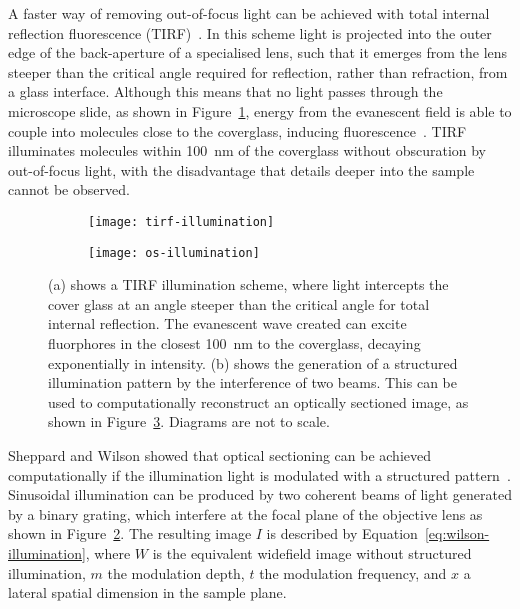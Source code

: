 A faster way of removing out-of-focus light can be achieved with total internal reflection fluorescence (TIRF)~\cite[\textit{ch. 21}]{periasamy2013methods}.
In this scheme light is projected into the outer edge of the back-aperture of a specialised lens, such that it emerges from the lens steeper than the critical angle required for reflection, rather than refraction, from a glass interface.
Although this means that no light passes through the microscope slide, as shown in Figure~\ref{fig:tirf-illumination}, energy from the evanescent field is able to couple into molecules close to the coverglass, inducing fluorescence~\cite{axelrod1981cell}.
TIRF illuminates molecules within \SI{100}{\nano\metre} of the coverglass without obscuration by out-of-focus light, with the disadvantage that details deeper into the sample cannot be observed.

\begin{figure}[tbp]
\centering
\begin{subfigure}[b]{0.49\textwidth}
	\texttt{[image: tirf-illumination]}
	\caption{}\label{fig:tirf-illumination}
\end{subfigure}
\hfill
\begin{subfigure}[b]{0.49\textwidth}
	\texttt{[image: os-illumination]}
	\caption{}\label{fig:os-illumination}
\end{subfigure}
\caption[LAG SIM: Both TIRF microscopy and structured illumination patterns can be used to remove out-of-focus light]{(a) shows a TIRF illumination scheme, where light intercepts the cover glass at an angle steeper than the critical angle for total internal reflection. The evanescent wave created can excite fluorphores in the closest \SI{100}{\nano\metre} to the coverglass, decaying exponentially in intensity. (b) shows the generation of a structured illumination pattern by the interference of two beams. This can be used to computationally reconstruct an optically sectioned image, as shown in Figure~\ref{fig:os-sim-comparison}. Diagrams are not to scale. }
\label{fig:os-sim-comparison}
\end{figure}

Sheppard and Wilson showed that optical sectioning can be achieved computationally if the illumination light is modulated with a structured pattern~\cite{pawley2012handbook, neil1997method}.
Sinusoidal illumination can be produced by two coherent beams of light generated by a binary grating, which interfere at the focal plane of the objective lens as shown in Figure~\ref{fig:os-illumination}.
The resulting image $I$ is described by Equation~\ref{eq:wilson-illumination}, where $W$ is the equivalent widefield image without structured illumination, $m$ the modulation depth, $t$ the modulation frequency, and $x$ a lateral spatial dimension in the sample plane.

